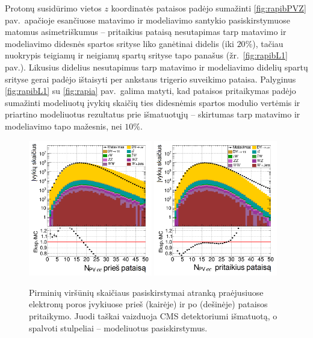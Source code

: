 \documentclass[a4paper, 12pt, oneside]{article}
\begin{document}
Protonų susidūrimo vietos $z$ koordinatės pataisos padėjo sumažinti \ref{fig:rapibPVZ} pav.\ apačioje esančiuose matavimo
ir modeliavimo santykio pasiskirstymuose matomus asimetriškumus -- pritaikius pataisą nesutapimas tarp matavimo ir modeliavimo
didesnės spartos srityse liko ganėtinai didelis (iki $20\%$), tačiau nuokrypis teigiamų ir neigiamų spartų srityse tapo panašus
(žr.\ \ref{fig:rapibL1} pav.).
Likusius didelius nesutapimus tarp matavimo ir modeliavimo didelių spartų srityse gerai padėjo ištaisyti per ankstaus trigerio
suveikimo pataisa.
Palyginus \ref{fig:rapibL1} su \ref{fig:rapia} pav.\ galima matyti, kad pataisos pritaikymas padėjo sumažinti modeliuotų įvykių
skaičių ties didesnėmis spartos modulio vertėmis ir priartino modeliuotus rezultatus prie išmatuotųjų -- skirtumas tarp matavimo
ir modeliavimo tapo mažesnis, nei $10\%$.

\begin{figure}[H]
	\includegraphics[width=0.48\textwidth]{nVTXee_before.png}
	\includegraphics[width=0.48\textwidth]{nVTXee_after.png}
	\caption{\label{fig:PUba} Pirminių viršūnių skaičiaus pasiskirstymai atranką praėjusiuose elektronų poros
		įvykiuose prieš (kairėje) ir po (dešinėje) pataisos pritaikymo.
		Juodi taškai vaizduoja CMS detektoriumi išmatuotą, o spalvoti stulpeliai -- modeliuotus pasiskirstymus.}
\end{figure}
\end{document}
